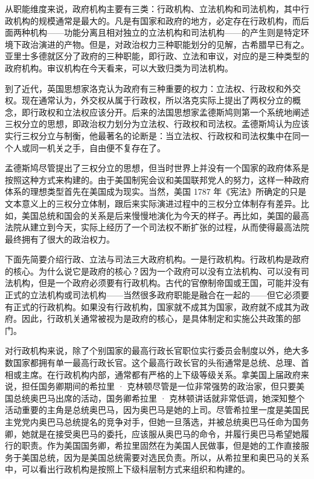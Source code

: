 从职能维度来说，政府机构主要有三类：行政机构、立法机构和司法机构，其中行政机构的规模通常是最大的。凡是有国家和政府的地方，必定存在行政机构，而后面两种机构——功能分离且相对独立的立法机构和司法机构——的产生则是特定环境下政治演进的产物。但是，对政治权力三种职能划分的见解，古希腊早已有之。亚里士多德就区分了政府的三种职能，即行政、立法和审议，对应的是三种类型的政府机构。审议机构在今天看来，可以大致归类为司法机构。

到了近代，英国思想家洛克认为政府有三种重要的权力：立法权、行政权和外交权。现在通常认为，外交权从属于行政权，所以洛克实际上提出了两权分立的概念，即行政权和立法权应该分开。后来的法国思想家孟德斯鸠则第一个系统地阐述三权分立的思想，即政治权力划分为立法权、行政权和司法权。孟德斯鸠认为应该实行三权分立与制衡，他最著名的论断是：当立法权、行政权和司法权集中在同一个人或同一机关之手，自由便不复存在了。

孟德斯鸠尽管提出了三权分立的思想，但当时世界上并没有一个国家的政府体系是按照这种方式来构建的。由于美国制宪会议和美国联邦党人的努力，这样一种政府体系的理想类型首先在美国成为现实。当然，美国 1787 年《宪法》所确定的只是文本意义上的三权分立体制，跟后来实际演进过程中的三权分立体制存有差异。比如，美国总统和国会的关系是后来慢慢地演化为今天的样子。再比如，美国的最高法院从建立到今天，实际上经历了一个司法权不断扩张的过程，从而使得最高法院最终拥有了很大的政治权力。

下面先简要介绍行政、立法与司法三大政府机构。一是行政机构。行政机构是政府的核心。为什么说它是政府的核心？因为一个政府可以没有立法机构、可以没有司法机构，但是一个政府必须要有行政机构。古代的官僚制帝国或王国，可能并没有正式的立法机构或司法机构——当然很多政府职能是融合在一起的——但它必须要有正式的行政机构。如果没有行政机构，国家就不成其为国家，政府就不成其为政府。因此，行政机关通常被视为是政府的核心，是具体制定和实施公共政策的部门。

对行政机构来说，除了个别国家的最高行政长官职位实行委员会制度以外，绝大多数国家都拥有单一最高行政长官。这个最高行政长官的头衔通常是总统、总理、首相或主席。在行政机构内部，通常都有严格的上下级等级关系。拿美国上届政府来说，担任国务卿期间的希拉里 · 克林顿尽管是一位非常强势的政治家，但只要美国总统奥巴马出席的活动，国务卿希拉里 · 克林顿讲话就非常低调，她深知整个活动重要的主角是总统奥巴马，因为奥巴马是她的上司。尽管希拉里一度是美国民主党党内奥巴马总统提名的竞争对手，但她一旦落选，并被总统奥巴马任命为国务卿，她就是在接受奥巴马的委托，应该服从奥巴马的命令，并履行奥巴马希望她履行的职责。作为美国国务卿，希拉里固然在为美国人民做事，但是她的工作直接服务于美国总统，因为是美国总统需要对选民负责。所以，从希拉里和奥巴马的关系中，可以看出行政机构是按照上下级科层制方式来组织和构建的。

